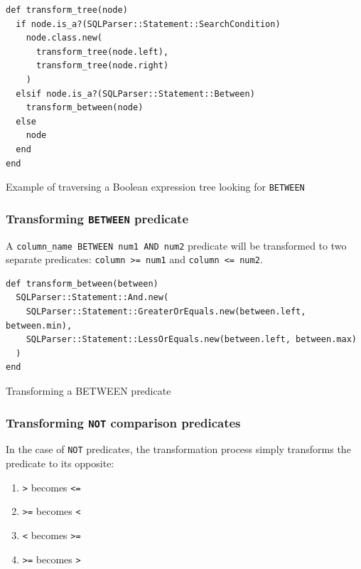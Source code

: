 \begin{code}
\begin{verbatim}
def transform_tree(node)
  if node.is_a?(SQLParser::Statement::SearchCondition)
    node.class.new(
      transform_tree(node.left),
      transform_tree(node.right)
    )
  elsif node.is_a?(SQLParser::Statement::Between)
    transform_between(node)
  else
    node
  end
end
\end{verbatim}
\caption{Example of traversing a Boolean expression tree looking for \texttt{BETWEEN}}
\end{code}

\subsubsection{Transforming \texttt{BETWEEN} predicate}

A \texttt{column_name BETWEEN num1 AND num2} predicate will be transformed to two separate predicates: \texttt{column >= num1} and \texttt{column <= num2}. 

\begin{code}
\begin{verbatim}
def transform_between(between)
  SQLParser::Statement::And.new(
    SQLParser::Statement::GreaterOrEquals.new(between.left, between.min),
    SQLParser::Statement::LessOrEquals.new(between.left, between.max)
  )
end
\end{verbatim}
\caption{Transforming a BETWEEN predicate}
\label{fig:transforming_a_betweeb}
\end{code}

\subsubsection{Transforming \texttt{NOT} comparison predicates}

In the case of \texttt{NOT} predicates, the transformation process simply transforms the predicate to its opposite:
\begin{enumerate}
    \item \texttt{>} becomes \texttt{<=}
    \item \texttt{>=} becomes \texttt{<}
    \item \texttt{<} becomes \texttt{>=}
    \item \texttt{>=} becomes \texttt{>}
\end{enumerate}

